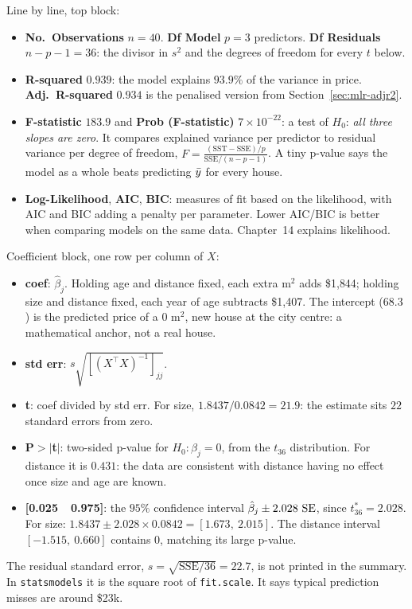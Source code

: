 Line by line, top block:
\begin{itemize}
  \item \textbf{No.\ Observations} $n = 40$. \textbf{Df Model} $p = 3$ predictors.
  \textbf{Df Residuals} $n - p - 1 = 36$: the divisor in $s^2$ and the degrees of
  freedom for every $t$ below.
  \item \textbf{R-squared} $0.939$: the model explains $93.9\%$ of the variance in
  price. \textbf{Adj.\ R-squared} $0.934$ is the penalised version from
  Section~\ref{sec:mlr-adjr2}.
  \item \textbf{F-statistic} $183.9$ and \textbf{Prob (F-statistic)} $7\times10^{-22}$:
  a test of $H_0$: \emph{all three slopes are zero}. It compares explained variance per
  predictor to residual variance per degree of freedom,
  $F = \frac{(\text{SST}-\text{SSE})/p}{\text{SSE}/(n-p-1)}$. A tiny p-value says the
  model as a whole beats predicting $\bar{y}$ for every house.
  \item \textbf{Log-Likelihood}, \textbf{AIC}, \textbf{BIC}: measures of fit based on
  the likelihood, with AIC and BIC adding a penalty per parameter. Lower AIC/BIC is
  better when comparing models on the same data. Chapter~14 explains likelihood.
\end{itemize}
Coefficient block, one row per column of $X$:
\begin{itemize}
  \item \textbf{coef}: $\hat\beta_j$. Holding age and distance fixed, each extra m$^2$
  adds \$1{,}844; holding size and distance fixed, each year of age subtracts \$1{,}407.
  The intercept ($68.3$) is the predicted price of a $0$ m$^2$, new house at the city
  centre: a mathematical anchor, not a real house.
  \item \textbf{std err}: $s\sqrt{[(X^\top X)^{-1}]_{jj}}$.
  \item \textbf{t}: coef divided by std err. For size, $1.8437/0.0842 = 21.9$: the
  estimate sits $22$ standard errors from zero.
  \item \textbf{P$>|$t$|$}: two-sided p-value for $H_0\colon\beta_j = 0$, from the $t_{36}$
  distribution. For distance it is $0.431$: the data are consistent with distance
  having no effect once size and age are known.
  \item \textbf{[0.025\ \ 0.975]}: the $95\%$ confidence interval
  $\hat\beta_j \pm 2.028\,\operatorname{SE}$, since $t^*_{36} = 2.028$. For size:
  $1.8437 \pm 2.028\times 0.0842 = [1.673,\ 2.015]$. The distance interval
  $[-1.515,\ 0.660]$ contains $0$, matching its large p-value.
\end{itemize}
The residual standard error, $s = \sqrt{\text{SSE}/36} = 22.7$, is not printed in the
summary. In \texttt{statsmodels} it is the square root of \texttt{fit.scale}. It says
typical prediction misses are around \$23k.

